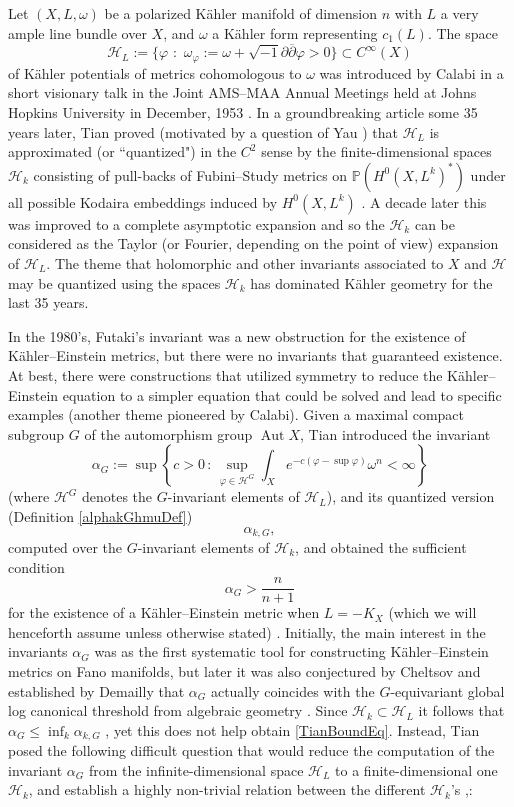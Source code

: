 \documentclass{article}
\newcommand\cH{{\mathcal H}}
\newcommand{\PP}{{\mathbb P}}
\renewcommand{\>}{\rightarrow}
\DeclareMathOperator{\Aut}{Aut}
\theoremstyle{plain}
\theoremstyle{definition}
\def\o{\omega}
\def\K{K\"ahler }
\def\KE{K\"ahler--Einstein }
\newcommand{\beq}{\begin{equation}}
\newcommand{\eeq}{\end{equation}}
\def\lb#1{\label{#1}}
\def\vp{\varphi}
\def\i{\sqrt{-1}}
\def\ddbar{\partial\overline{\partial}}
\begin{document}
Let $(X,L,\o)$ be a polarized \K manifold of dimension $n$ with $L$ 
a very ample line bundle over $X$, and $\omega$ a \K form
representing $c_1(L)$.
The space 
\beq
\lb{HLEq}
\cH_L:=
\{\vp \,\,:\,\, \omega_\vp:=\o+\i\ddbar\vp>0\}\subset C^\infty(X)
\eeq
of \K potentials of metrics cohomologous to $\omega$ 
was introduced by Calabi in a short visionary talk in the Joint AMS--MAA Annual Meetings held
at Johns Hopkins University in December, 1953 \cite{Calabi}.
In a groundbreaking article
some 35 years later, Tian proved
(motivated by a question of Yau \cite[p. 139]{Yau2})
that $\cH_L$ is approximated
(or ``quantized")
in the $C^2$ sense 
by the finite-dimensional
spaces 
$
\cH_k
$
consisting of pull-backs of Fubini--Study metrics on $\PP(H^0(X,L^k)^*)$ 
under all possible Kodaira embeddings induced by $H^0(X,L^k)$
\cite{Tian90}.
A decade later this was improved to a complete asymptotic expansion
\cite{Catlin,Zel}
and so the $\cH_k$ can be considered as the Taylor 
(or Fourier, depending on the point of view) expansion of $\cH_L$.
The theme  
that holomorphic
and other 
invariants associated to $X$ and $\cH$
may be quantized using the 
spaces $\cH_k$
has dominated K\"ahler geometry for the last 
35 years.

In the 1980's, Futaki's invariant
was a new obstruction for the existence of \KE metrics, but
there were no invariants that guaranteed existence. At best,
there were constructions that utilized symmetry to reduce the \KE equation to a simpler equation that could be solved and lead to specific examples
(another theme pioneered by Calabi). %
Given a maximal compact subgroup $G$ of the automorphism
group $\Aut X$, Tian introduced
the invariant
$$
\alpha_G:=\sup
\left\{c>0\,:\,\sup_{\varphi\in \cH^G}\int_Xe^{-c(\varphi-\sup\varphi)}\omega^n<\infty\right\}
$$
(where $\cH^G$ denotes the $G$-invariant elements of $\cH_L$),
and its quantized version (Definition \ref{alphakGhmuDef})
$$
\alpha_{k,G},
$$
computed over the $G$-invariant elements of $\cH_k$,
and obtained the sufficient condition  
\beq
\lb{TianBoundEq}
\alpha_G>\frac n{n+1}
\eeq
for the existence of a \KE metric
when $L=-K_X$ (which we will henceforth assume unless otherwise stated)
\cite[Theorem 4.1]{Tian87}.
Initially, the main interest in 
the invariants $\alpha_G$ was as
the first systematic tool for constructing \KE metrics on Fano
manifolds, but later it was also conjectured by Cheltsov
and established by Demailly that $\alpha_G$ actually coincides
with the $G$-equivariant global log canonical threshold from
algebraic geometry \cite{CS08}. 
Since $\cH_k\subset\cH_L$ it follows that  
$\alpha_G\le\inf_k\alpha_{k,G}$ \cite[p. 128]{Tian90},
yet this does not help obtain \eqref{TianBoundEq}.
Instead, Tian posed the following difficult question that would reduce the computation of 
the invariant $\alpha_G$ from the infinite-dimensional space $\cH_L$
to a finite-dimensional one $\cH_k$, and establish
a highly non-trivial relation between the different $\cH_k$'s
\cite[Question 1]{Tian90},\cite{Tian88}:
\end{document}
